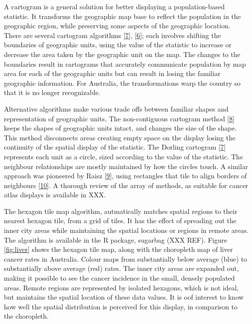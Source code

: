 \documentclass[conference,final,]{IEEEtran}
\begin{document}
A cartogram is a general solution for better displaying a population-based statistic. It transforms the geographic map base to reflect the population in the geographic region, while preserving some aspects of the geographic location. There are several cartogram algorithms {[}\protect\hyperlink{ref-ACTUC}{7}{]}, {[}\protect\hyperlink{ref-CBATCC}{6}{]}; each involves shifting the boundaries of geographic units, using the value of the statistic to increase or decrease the area taken by the geographic unit on the map. The changes to the boundaries result in cartograms that accurately communicate population by map area for each of the geographic units but can result in losing the familiar geographic information. For Australia, the transformations warp the country so that it is no longer recognizable.

Alternative algorithms make various trade offs between familiar shapes and representation of geographic units. The non-contiguous cartogram method {[}\protect\hyperlink{ref-NAC}{8}{]} keeps the shapes of geographic units intact, and changes the size of the shape. This method disconnects areas creating empty space on the display losing the continuity of the spatial display of the statistic. The Dorling cartogram {[}\protect\hyperlink{ref-ACTUC}{7}{]} represents each unit as a circle, sized according to the value of the statistic. The neighbour relationships are mostly maintained by how the circles touch. A similar approach was pioneered by Raisz {[}\protect\hyperlink{ref-RSCW}{9}{]}, using rectangles that tile to align borders of neighbours {[}\protect\hyperlink{ref-CDWCS}{10}{]}. A thorough review of the array of methods, as suitable for cancer atlas displays is available in XXX.

The hexagon tile map algorithm, autmatically matches spatial regions to their nearest hexagon tile, from a grid of tiles. It has the effect of spreading out the inner city areas while maintaining the spatial locations or regions in remote areas. The algorithm is available in the R package, sugarbag (XXX REF). Figure \ref{fig:liver} shows the hexagon tile map, along with the choropleth map of liver cancer rates in Australia. Colour maps from substantially below average (blue) to substantially above average (red) rates. The inner city areas are expanded out, making it possible to see the cancer incidence in the small, densely populated areas. Remote regions are represented by isolated hexagons, which is not ideal, but maintains the spatial location of these data values. It is oof interest to know how well the spatial distribution is perceived for this display, in comparison to the choropleth.
\end{document}
